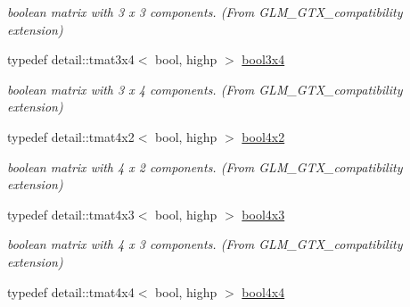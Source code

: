 \begin{CompactItemize}
\begin{CompactList}\small\item\em boolean matrix with 3 x 3 components. (From GLM\_\-GTX\_\-compatibility extension) \item\end{CompactList}\item 
\hypertarget{group__gtx__compatibility_gf68d62e1c790fa3f09ef5e866af690f1}{
typedef detail::tmat3x4$<$ bool, highp $>$ \hyperlink{group__gtx__compatibility_gf68d62e1c790fa3f09ef5e866af690f1}{bool3x4}}
\label{group__gtx__compatibility_gf68d62e1c790fa3f09ef5e866af690f1}

\begin{CompactList}\small\item\em boolean matrix with 3 x 4 components. (From GLM\_\-GTX\_\-compatibility extension) \item\end{CompactList}\item 
\hypertarget{group__gtx__compatibility_ga431c2e87e8d78c4780c938a9483d6ff}{
typedef detail::tmat4x2$<$ bool, highp $>$ \hyperlink{group__gtx__compatibility_ga431c2e87e8d78c4780c938a9483d6ff}{bool4x2}}
\label{group__gtx__compatibility_ga431c2e87e8d78c4780c938a9483d6ff}

\begin{CompactList}\small\item\em boolean matrix with 4 x 2 components. (From GLM\_\-GTX\_\-compatibility extension) \item\end{CompactList}\item 
\hypertarget{group__gtx__compatibility_g7acb207ab877c53dc5751752e1f70053}{
typedef detail::tmat4x3$<$ bool, highp $>$ \hyperlink{group__gtx__compatibility_g7acb207ab877c53dc5751752e1f70053}{bool4x3}}
\label{group__gtx__compatibility_g7acb207ab877c53dc5751752e1f70053}

\begin{CompactList}\small\item\em boolean matrix with 4 x 3 components. (From GLM\_\-GTX\_\-compatibility extension) \item\end{CompactList}\item 
\hypertarget{group__gtx__compatibility_g4738dad3625bfa64ddf218897da020e9}{
typedef detail::tmat4x4$<$ bool, highp $>$ \hyperlink{group__gtx__compatibility_g4738dad3625bfa64ddf218897da020e9}{bool4x4}}
\label{group__gtx__compatibility_g4738dad3625bfa64ddf218897da020e9}


\end{CompactItemize}
